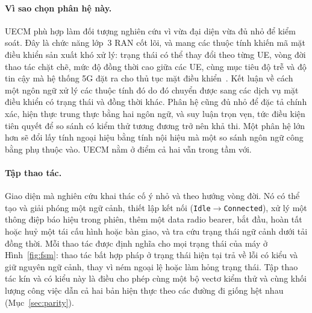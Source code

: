 \paragraph{Vì sao chọn phân hệ này.}
UECM phù hợp làm đối tượng nghiên cứu vì vừa đại diện vừa đủ nhỏ để kiểm soát. Đây là chức năng
lớp~3 RAN cốt lõi, và mang các thuộc tính khiến mã mặt điều khiển sản xuất khó xử lý: trạng thái
có thể thay đổi theo từng UE, vòng đời thao tác chặt chẽ, mức độ đồng thời cao giữa các UE, cùng
mục tiêu độ trễ và độ tin cậy mà hệ thống 5G đặt ra cho thủ tục mặt điều
khiển~\cite{3gpp38913,3gpp22261}. Kết luận về cách một ngôn ngữ xử lý các thuộc tính đó do đó
chuyển được sang các dịch vụ mặt điều khiển có trạng thái và đồng thời khác. Phân hệ cũng đủ
nhỏ để đặc tả chính xác, hiện thực trung thực bằng hai ngôn ngữ, và suy luận trọn vẹn, tức điều
kiện tiên quyết để so sánh có kiểm thử tương đương trở nên khả thi. Một phân hệ lớn hơn sẽ đổi
lấy tính ngoại hiệu bằng tính nội hiệu mà một so sánh ngôn ngữ công bằng phụ thuộc vào. UECM
nằm ở điểm cả hai vẫn trong tầm với.

\paragraph{Tập thao tác.}
Giao diện mà nghiên cứu khai thác cố ý nhỏ và theo hướng vòng đời. Nó có thể tạo và giải phóng
một ngữ cảnh, thiết lập kết nối (\texttt{Idle}$\rightarrow$\texttt{Connected}), xử lý một thông
điệp báo hiệu trong phiên, thêm một data radio bearer, bắt đầu, hoàn tất hoặc huỷ một tái cấu
hình hoặc bàn giao, và tra cứu trạng thái ngữ cảnh dưới tải đồng thời. Mỗi thao tác được định
nghĩa cho mọi trạng thái của máy ở Hình~\ref{fig:fsm}: thao tác bất hợp pháp ở trạng thái hiện
tại trả về lỗi có kiểu và giữ nguyên ngữ cảnh, thay vì ném ngoại lệ hoặc làm hỏng trạng thái.
Tập thao tác kín và có kiểu này là điều cho phép cùng một bộ vectơ kiểm thử và cùng khối lượng
công việc dẫn cả hai bản hiện thực theo các đường đi giống hệt nhau (Mục~\ref{sec:parity}).

